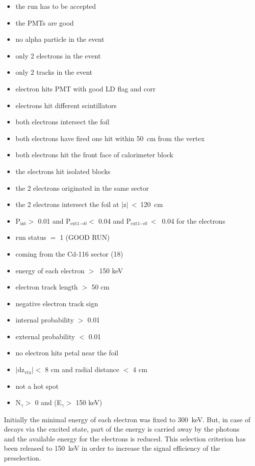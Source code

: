 \documentclass[main.tex]{subfiles}
\begin{document}
\begin{multicols}{2}
\begin{itemize}
\item the run has to be accepted
\item the PMTs are good 
\item no alpha particle in the event
\item only 2 electrons in the event 
\item only 2 tracks in the event 
\item electron hits PMT with good LD flag and corr
\item electrons hit different scintillators
\item both electrons intersect the foil
\item both electrons have fired one hit within 50~cm from the vertex
\item both electrons hit the front face of calorimeter block
\item the electrons hit isolated blocks
\item the 2 electrons originated in the same sector 
\item the 2 electrons intersect the foil at $|\text{z}|~<~$120~cm  
\item P$_{\text{int}} > $ 0.01 and P$_{\text{ext1} \rightarrow \text{0}} < $ 0.04 and P$_{\text{ext1} \rightarrow \text{0}}~<~$ 0.04 for the electrons 
\item run status $=$ 1 (GOOD RUN)  
\item coming from the Cd-116 sector (18)  
\item energy of each electron $>$~150 keV   
\item electron track length $> $ 50 cm   
\item negative electron track sign   
\item internal probability $>$ 0.01     
\item external probability $<$ 0.01   
\item no electron hits petal near the foil   
\item $|\text{dz}_\text{vtx}| < $ 8 cm and radial distance $ <$ 4 cm     
\item not a hot spot    
\item N$_{\gamma} >$ 0 and (E$_{\gamma}>$ 150 keV)  
 
\end{itemize}
\end{multicols}


\NI Initially the minimal energy of each electron was fixed to 300~keV. But, in case of decays via the excited state, part of the energy is carried away by the photons and the available energy for the electrons is reduced. This selection criterion has been released to 150~keV in order to increase the signal efficiency of the preselection.
\end{document}
